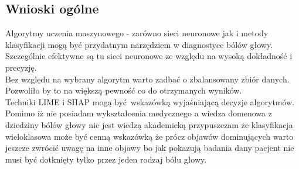 \subsection{Wnioski ogólne}
Algorytmy uczenia maszynowego - zarówno sieci neuronowe jak i metody klasyfikacji mogą być przydatnym narzędziem w diagnostyce bólów głowy.\\

Szczególnie efektywne są tu sieci neuronowe ze względu na wysoką dokładność i precyzję.\\

Bez względu na wybrany algorytm warto zadbać o zbalansowany zbiór danych. Pozwoliło by to na większą pewność co do otrzymanych wyników.\\

Techniki LIME i SHAP mogą być wskazówką wyjaśniającą decyzje algorytmów.\\

Pomimo iż nie posiadam wykształcenia medycznego a wiedza domenowa z dziedziny bólów głowy nie jest wiedzą akademicką przypuszczam że klasyfikacja wieloklasowa może być cenną wskazówką że prócz objawów dominujących warto jeszcze zwrócić uwagę na inne objawy bo jak pokazują badania dany pacjent nie musi być dotknięty tylko przez jeden rodzaj bólu głowy.
